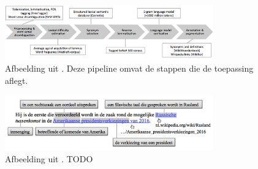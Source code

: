 
\begin{figure}[H]
	\begin{center}
			\includegraphics[width=9cm]{img/dutch-simplification-dyslexia-pipeline.png}
	\end{center}
	\caption{Afbeelding uit \textcite{Bulte2018}. Deze pipeline omvat de stappen die de toepassing aflegt. }
\end{figure}

\begin{figure}[H]
	\begin{center}
			\includegraphics[width=9cm]{img/dutch-simplification-dyslexia-example.png}
	\end{center}
	\caption{Afbeelding uit \textcite{Bulte2018}. TODO}
\end{figure}


